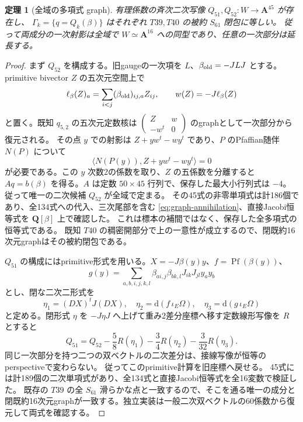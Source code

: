 \documentclass[11pt,a4paper]{ltjsarticle}
\newcommand{\QQ}{\mathbf Q}
\renewcommand{\AA}{\mathbf A}
\newcommand{\dd}{\mathrm d}
\newtheorem{theorem}{定理}[section]
\theoremstyle{remark}
\begin{document}
\begin{theorem}[全域の多項式 graph]
有理係数の斉次二次写像 $Q_{51},Q_{52}:W\to\AA^{45}$ が存在し、
$\Gamma_k=\{q=Q_k(\beta)\}$ はそれぞれ $T39,T40$ の被約 $S_{61}$ 閉包に等しい。
従って両成分の一次射影は全域で $W\simeq\AA^{16}$ への同型であり、任意の一次部分は延長する。
\end{theorem}
\begin{proof}
まず $Q_{52}$ を構成する。旧gaugeの一次項を $L$、$\beta_{\rm old}=-JLJ$ とする。
primitive bivector $Z$ の五次元空間上で
\[
 \ell_\beta(Z)_a=\sum_{i<j}(\beta_{\rm old})_{ij,a}Z_{ij},\qquad
 w(Z)=-J\ell_\beta(Z)
\]
と置く。既知 $q_{5,2}$ の五次元定数核は
$\left(\begin{smallmatrix}Z&w\\-w^t&0\end{smallmatrix}\right)$ のgraphとして一次部分から復元される。
その点 $y$ での射影は $Z+yw^t-wy^t$ であり、$P$ のPfaffian随伴 $N(P)$ について
\begin{equation}\label{eq:graph-annihilation}
 \langle N(P(y)),Z+yw^t-wy^t\rangle=0
\end{equation}
が必要である。この $y$ 次数2の係数を取り、$Z$ の五係数を分離すると
$Aq=b(\beta)$ を得る。$A$ は定数 $50\times45$ 行列で、保存した最大小行列式は $-4$。
従って唯一の二次候補 $Q_{52}$ が全域で定まる。
その45式の非零単項式は計186個であり、全134式への代入、三次尾部を含む
\eqref{eq:graph-annihilation}、直接Jacobi恒等式を $\QQ[\beta]$ 上で確認した。
これは標本の補間ではなく、保存した全多項式の恒等式である\cite{universal-sections}。
既知 $T40$ の稠密開部分で上の一意性が成立するので、閉既約16次元graphはその被約閉包である。

$Q_{51}$ の構成にはprimitive形式を用いる。$X=-J\beta(y)y$、$f=\operatorname{Pf}(\beta(y))$、
\[
 g(y)=\sum_{a,b,i,j,k,l}\beta_{ai,j}\beta_{bk,l}J_{ik}J_{jl}y_ay_b
\]
とし、閉な二次二形式を
\[
 \eta_1=(DX)^tJ(DX),\quad
 \eta_2=\dd(f\,\iota_E\Omega),\quad
 \eta_3=\dd(g\,\iota_E\Omega)
\]
と定める。閉形式 $\eta$ を $-J\eta J$ へ上げて重み2差分座標へ移す定数線形写像を $R$ とすると
\begin{equation}\label{eq:universal-q51}
 Q_{51}=Q_{52}-\frac58R(\eta_1)-\frac34R(\eta_2)-\frac3{32}R(\eta_3).
\end{equation}
同じ一次部分を持つ二つの双ベクトルの二次差分は、接線写像が恒等のperspectiveで変わらない。
従ってこのprimitive計算を旧座標へ戻せる。
45式には計189個の二次単項式があり、全134式と直接Jacobi恒等式を全16変数で検証した。
既存の $T39$ の全 $S_{61}$ 滑らかな点と一致するので、そこを通る唯一の成分と
閉既約16次元graphが一致する。独立実装は一般二次双ベクトルの60係数から復元して両式を確認する。
\end{proof}
\end{document}

